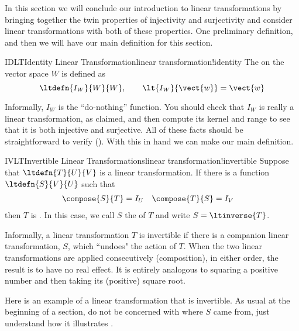 %
In this section we will conclude our introduction to linear transformations by bringing together the twin properties of injectivity and surjectivity and consider linear transformations with both of these properties.
%
%
One preliminary definition, and then we will have our main definition for this section.
%
%
\begin{definition}{IDLT}{Identity Linear Transformation}{linear transformation!identity}
The  on the vector space $W$ is defined as
%
\begin{equation*}
\ltdefn{I_W}{W}{W},\quad\quad \lt{I_W}{\vect{w}}=\vect{w}
\end{equation*}
%
\end{definition}
%
Informally, $I_W$ is the ``do-nothing'' function.  You should check that $I_W$ is really a linear transformation, as claimed, and then compute its kernel and range to see that it is both injective and surjective.  All of these facts should be straightforward to verify ().  With this in hand we can make our main definition.
%
%
\begin{definition}{IVLT}{Invertible Linear Transformations}{linear transformation!invertible}
Suppose that $\ltdefn{T}{U}{V}$ is a linear transformation.  If there is a function $\ltdefn{S}{V}{U}$ such that
%
\begin{align*}
\compose{S}{T}&=I_U & \compose{T}{S}&=I_V
\end{align*}
%
then $T$ is .  In this case, we call $S$ the  of $T$ and write $S=\ltinverse{T}$.
\end{definition}
%
Informally, a linear transformation $T$ is invertible if there is a companion linear transformation, $S$, which ``undoes" the action of $T$.  When the two linear transformations are applied consecutively (composition), in either order, the result is to have no real effect.  It is entirely analogous to squaring a positive number and then taking its (positive) square root.\par
%
Here is an example of a linear transformation that is invertible.  As usual at the beginning of a section, do not be concerned with where $S$ came from, just understand how it illustrates .
